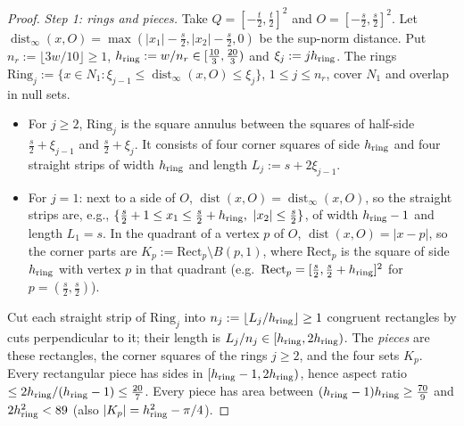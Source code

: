 \documentclass[11pt]{article}
\theoremstyle{definition}
\theoremstyle{remark}
\begin{document}
\begin{proof}
\emph{Step 1: rings and pieces.} Take $Q=[-\tfrac t2,\tfrac t2]^2$ and $O=[-\tfrac s2,\tfrac s2]^2$. Let
$\operatorname{dist}_\infty(x,O)=\max(|x_1|-\tfrac s2,|x_2|-\tfrac s2,0)$ be the sup-norm distance. Put
$n_r:=\lfloor3w/10\rfloor\ge1$, $h_{\rm ring}:=w/n_r\in[\tfrac{10}3,\tfrac{20}3)$ and $\xi_j:=jh_{\rm ring}$. The rings
$\mathrm{Ring}_j:=\{x\in N_1:\xi_{j-1}\le\operatorname{dist}_\infty(x,O)\le\xi_j\}$, $1\le j\le n_r$, cover $N_1$ and
overlap in null sets.
\begin{itemize}[leftmargin=*]
\item For $j\ge2$, $\mathrm{Ring}_j$ is the square annulus between the squares of half-side $\tfrac s2+\xi_{j-1}$
  and $\tfrac s2+\xi_j$. It consists of four corner squares of side $h_{\rm ring}$ and four straight strips of
  width $h_{\rm ring}$ and length $L_j:=s+2\xi_{j-1}$.
\item For $j=1$: next to a side of $O$, $\operatorname{dist}(x,O)=\operatorname{dist}_\infty(x,O)$, so the
  straight strips are, e.g., $\{\tfrac s2+1\le x_1\le\tfrac s2+h_{\rm ring},\ |x_2|\le\tfrac s2\}$, of width
  $h_{\rm ring}-1$ and length $L_1=s$. In the quadrant of a vertex $p$ of $O$, $\operatorname{dist}(x,O)=|x-p|$,
  so the corner parts are $K_p:=\mathrm{Rect}_p\setminus B(p,1)$, where $\mathrm{Rect}_p$ is the square of
  side $h_{\rm ring}$ with vertex $p$ in that quadrant (e.g.\ $\mathrm{Rect}_p=[\tfrac s2,\tfrac s2+h_{\rm ring}]^2$
  for $p=(\tfrac s2,\tfrac s2)$).
\end{itemize}
Cut each straight strip of $\mathrm{Ring}_j$ into $n_j:=\lfloor L_j/h_{\rm ring}\rfloor\ge1$ congruent rectangles
by cuts perpendicular to it; their length is $L_j/n_j\in[h_{\rm ring},2h_{\rm ring})$. The \emph{pieces} are
these rectangles, the corner squares of the rings $j\ge2$, and the four sets $K_p$. Every rectangular piece
has sides in $[h_{\rm ring}-1,2h_{\rm ring})$, hence aspect ratio $\le2h_{\rm ring}/(h_{\rm ring}-1)\le\tfrac{20}7$.
Every piece has area between $(h_{\rm ring}-1)h_{\rm ring}\ge\tfrac{70}9$ and $2h_{\rm ring}^2<89$ (also
$|K_p|=h_{\rm ring}^2-\pi/4$).


\end{proof}
\end{document}
